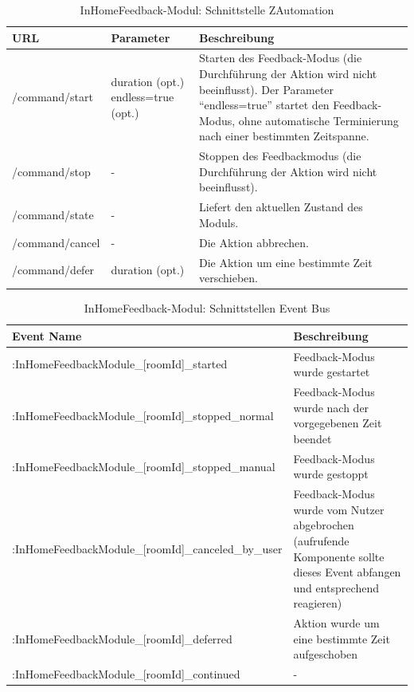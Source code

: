 \begin{table}[H]
	\begin{tabularx}{\textwidth}{
			>{\hsize=1.25\hsize}X %
			>{\hsize=0.5\hsize\centering}X %
			>{\hsize=1.25\hsize}X %
		}
		\hline
		\textbf{URL}						& \textbf{Parameter}	& \textbf{Beschreibung} \\
		\hline 
		/command/start				
				& duration (opt.) \newline endless=true (opt.) 	
						& Starten des Feedback-Modus (die Durchführung der Aktion wird nicht beeinflusst). Der Parameter "`endless=true"' startet den Feedback-Modus, ohne automatische Terminierung nach einer bestimmten Zeitspanne. \\ 
		\hline 
		/command/stop		
				& - 			 		
						& Stoppen des Feedbackmodus (die Durchführung der Aktion wird nicht beeinflusst). \\
		\hline 
		/command/state
				& - 				
						& Liefert den aktuellen Zustand des Moduls. \\
		\hline
		/command/cancel
				& -
						& Die Aktion abbrechen. \\
		\hline
		/command/defer
				& duration (opt.)
						& Die Aktion um eine bestimmte Zeit verschieben. \\
		\hline
	\end{tabularx}
	\caption{InHomeFeedback-Modul: Schnittstelle ZAutomation}
\end{table}

\begin{table}[H]
	\begin{tabularx}{\textwidth}{
			>{\hsize=1.2\hsize}X 
			>{\hsize=0.8\hsize}X
		}
		\hline
		\textbf{Event Name}						& \textbf{Beschreibung} \\
		\hline
		[deviceId]:InHomeFeedbackModule\_[roomId]\_started	
				& Feedback-Modus wurde gestartet \\
		\hline 
		[deviceId]:InHomeFeedbackModule\_[roomId]\_stopped\_normal
				& Feedback-Modus wurde nach der vorgegebenen Zeit beendet \\
		\hline
		[deviceId]:InHomeFeedbackModule\_[roomId]\_stopped\_manual
				& Feedback-Modus wurde  gestoppt \\
		\hline
		[deviceId]:InHomeFeedbackModule\_[roomId]\_canceled\_by\_user
				& Feedback-Modus wurde vom Nutzer abgebrochen (aufrufende Komponente sollte dieses Event abfangen und entsprechend reagieren) \\
		\hline
		[deviceId]:InHomeFeedbackModule\_[roomId]\_deferred
				& Aktion wurde um eine bestimmte Zeit aufgeschoben \\
		\hline
		[deviceId]:InHomeFeedbackModule\_[roomId]\_continued
				& - \\
		\hline
	\end{tabularx}
	\caption{InHomeFeedback-Modul: Schnittstellen Event Bus}
\end{table}

